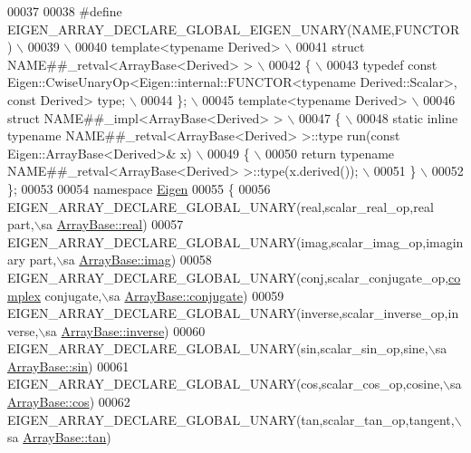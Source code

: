 \begin{DoxyCode}
00037 
00038 \textcolor{preprocessor}{#define EIGEN\_ARRAY\_DECLARE\_GLOBAL\_EIGEN\_UNARY(NAME,FUNCTOR) \(\backslash\)}
00039 \textcolor{preprocessor}{  \(\backslash\)}
00040 \textcolor{preprocessor}{  template<typename Derived> \(\backslash\)}
00041 \textcolor{preprocessor}{  struct NAME##\_retval<ArrayBase<Derived> > \(\backslash\)}
00042 \textcolor{preprocessor}{  \{ \(\backslash\)}
00043 \textcolor{preprocessor}{    typedef const Eigen::CwiseUnaryOp<Eigen::internal::FUNCTOR<typename Derived::Scalar>, const Derived>
       type; \(\backslash\)}
00044 \textcolor{preprocessor}{  \}; \(\backslash\)}
00045 \textcolor{preprocessor}{  template<typename Derived> \(\backslash\)}
00046 \textcolor{preprocessor}{  struct NAME##\_impl<ArrayBase<Derived> > \(\backslash\)}
00047 \textcolor{preprocessor}{  \{ \(\backslash\)}
00048 \textcolor{preprocessor}{    static inline typename NAME##\_retval<ArrayBase<Derived> >::type run(const Eigen::ArrayBase<Derived>& x)
       \(\backslash\)}
00049 \textcolor{preprocessor}{    \{ \(\backslash\)}
00050 \textcolor{preprocessor}{      return typename NAME##\_retval<ArrayBase<Derived> >::type(x.derived()); \(\backslash\)}
00051 \textcolor{preprocessor}{    \} \(\backslash\)}
00052 \textcolor{preprocessor}{  \};}
00053 
00054 \textcolor{keyword}{namespace }\hyperlink{namespace_eigen}{Eigen}
00055 \{
00056   EIGEN\_ARRAY\_DECLARE\_GLOBAL\_UNARY(real,scalar\_real\_op,real part,\(\backslash\)sa 
      \hyperlink{group___core___module_a3c09942b87b89c06dc204fe8cf514ade}{ArrayBase::real})
00057   EIGEN\_ARRAY\_DECLARE\_GLOBAL\_UNARY(imag,scalar\_imag\_op,imaginary part,\(\backslash\)sa 
      \hyperlink{group___core___module_ac0e2019654b0bf1e82ada75b3ea9e5ef}{ArrayBase::imag})
00058   EIGEN\_ARRAY\_DECLARE\_GLOBAL\_UNARY(conj,scalar\_conjugate\_op,\hyperlink{structcomplex}{complex} conjugate,\(\backslash\)sa 
      \hyperlink{group___core___module_a06602058e7d80827b7b0ec7cb72a747a}{ArrayBase::conjugate})
00059   EIGEN\_ARRAY\_DECLARE\_GLOBAL\_UNARY(inverse,scalar\_inverse\_op,inverse,\(\backslash\)sa 
      \hyperlink{group___core___module_a6b2a84065ff875d9491cf8d84ddbee2f}{ArrayBase::inverse})
00060   EIGEN\_ARRAY\_DECLARE\_GLOBAL\_UNARY(sin,scalar\_sin\_op,sine,\(\backslash\)sa \hyperlink{group___core___module_a8f857f93533ac386282f47c5ef05459a}{ArrayBase::sin})
00061   EIGEN\_ARRAY\_DECLARE\_GLOBAL\_UNARY(cos,scalar\_cos\_op,cosine,\(\backslash\)sa \hyperlink{group___core___module_abe1bff4421b16e62e75f932b83c4d31f}{ArrayBase::cos})
00062   EIGEN\_ARRAY\_DECLARE\_GLOBAL\_UNARY(tan,scalar\_tan\_op,tangent,\(\backslash\)sa \hyperlink{group___core___module_acc502922cf9aeb43b07b30f250cd1d21}{ArrayBase::tan})

\end{DoxyCode}
